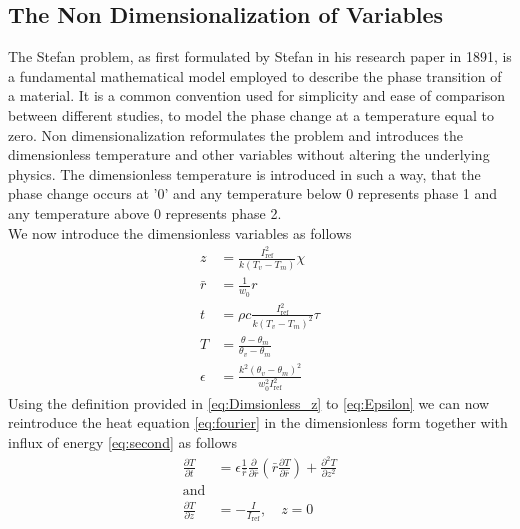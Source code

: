 \subsection{The Non Dimensionalization of Variables \label{sec:Nondimensionalization}}
The Stefan problem, as first formulated by Stefan in his research paper\cite{stefan1891theorie} in 1891, is a fundamental mathematical model employed to describe the phase transition of a material. It is a common convention used for simplicity and ease of comparison between different studies, to model the phase change at a temperature equal to zero. Non dimensionalization reformulates the problem and introduces the dimensionless temperature and other variables without altering the underlying physics. The dimensionless temperature is introduced in such a way, that the phase change occurs at '0' and any temperature below 0 represents phase 1 and any temperature above 0 represents phase 2.\\ 
We now introduce the dimensionless variables as follows
\begin{subequations}
\begin{align}
z &= \frac{I_{\text{ref}}^2}{k(T_v - T_m)}  \chi \label{eq:Dimsionless_z}\\
\bar{r} &= \frac{1}{w_0}  r \\
t &= \rho c \frac{I_{\text{ref}}^2}{k(T_v - T_m)^2}\tau\\
T &= \frac{\theta - \theta_m}{\theta_v - \theta_m}\\
\epsilon &= \frac{k^2(\theta_v - \theta_m)^2}{w_0^2I_{\text{ref}}^2} \label{eq:Epsilon}
\end{align}
\end{subequations}
Using the definition provided in \eqref{eq:Dimsionless_z} to \eqref{eq:Epsilon} we can now reintroduce the heat equation \eqref{eq:fourier} in the dimensionless form together with influx of energy \eqref{eq:second} as follows 
\begin{align}
\frac{\partial T}{\partial t} &= \epsilon \frac{1}{\bar{r}} \frac{\partial}{\partial \bar{r}} \left( \bar{r} \frac{\partial T}{\partial \bar{r}} \right) + \frac{\partial^2 T}{\partial z^2} \label{eq:nondimensional}\\
\text{and} \nonumber \\
\frac{\partial T}{\partial z} &= -\frac{I}{I_{\text{ref}}}, \quad z = 0
\end{align}

